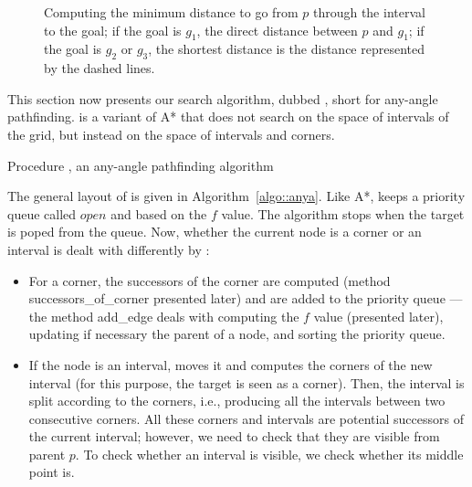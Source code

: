 \begin{figure}[ht]
  \begin{center}
    
  \end{center}
  \caption{Computing the minimum distance 
    to go from $p$ through the interval to the goal; 
    if the goal is $g_1$, the direct distance between $p$ and $g_1$; 
    if the goal is $g_2$ or $g_3$, 
    the shortest distance is the distance represented by the dashed lines.}
  \label{fig::fvalue}
\end{figure}

This section now presents our search algorithm, dubbed \anya, short for
any-angle pathfinding.  \anya{} is a variant of A* that does not search on the
space of intervals of the grid, but instead on the space of intervals and
corners.

\begin{algorithm}[ht!]
  
  \caption{Procedure \anya, an any-angle pathfinding algorithm}
  \label{algo::anya}
\end{algorithm}

The general layout of \anya{} is given in Algorithm~\ref{algo::anya}.  
Like A*, \anya{} keeps a priority queue called $open$ 
and based on the $f$ value.  
The algorithm stops when the target is poped from the queue.  
Now, whether the current node is a corner or an interval 
is dealt with differently by \anya: 
\begin{itemize}
\item 
  For a corner, the successors of the corner are computed 
  (method successors\_of\_corner presented later) 
  and are added to the priority queue --- 
  the method add\_edge deals with computing the $f$ value 
  (presented later), updating if necessary the parent of a node, 
  and sorting the priority queue.  
\item 
  If the node is an interval, \anya{} moves it 
  and computes the corners of the new interval 
  (for this purpose, the target is seen as a corner).  
  Then, the interval is split according to the corners, 
  i.e., producing all the intervals between two consecutive corners.  
  All these corners and intervals 
  are potential successors of the current interval; 
  however, we need to check that they are visible from parent $p$.  
  To check whether an interval is visible, 
  we check whether its middle point is.  
\end{itemize}


